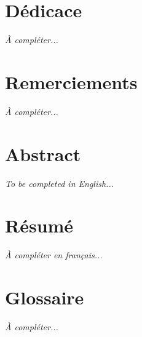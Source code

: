 \chapter*{Dédicace}
\begin{center}
    \textit{À compléter...}
\end{center}
\newpage

\chapter*{Remerciements}
\textit{À compléter...}
\newpage

\chapter*{Abstract}
\textit{To be completed in English...}
\newpage

\chapter*{Résumé}
\textit{À compléter en français...}
\newpage

\chapter*{Glossaire}
\textit{À compléter...}
\newpage

\listoffigures
{}
\newpage

\listoftables
{}
\newpage

\tableofcontents
\newpage
